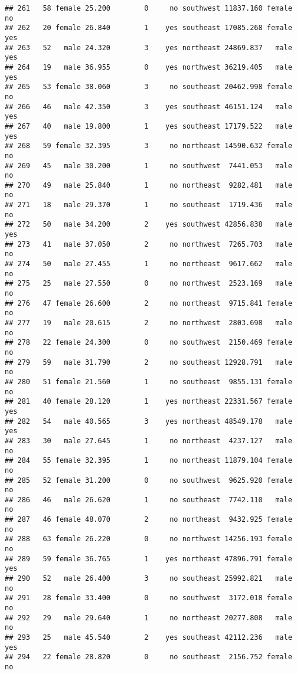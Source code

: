 \documentclass[
]{article}
\begin{document}
\begin{verbatim}
## 261   58 female 25.200        0     no southwest 11837.160 female       no
## 262   20 female 26.840        1    yes southeast 17085.268 female      yes
## 263   52   male 24.320        3    yes northeast 24869.837   male      yes
## 264   19   male 36.955        0    yes northwest 36219.405   male      yes
## 265   53 female 38.060        3     no southeast 20462.998 female       no
## 266   46   male 42.350        3    yes southeast 46151.124   male      yes
## 267   40   male 19.800        1    yes southeast 17179.522   male      yes
## 268   59 female 32.395        3     no northeast 14590.632 female       no
## 269   45   male 30.200        1     no southwest  7441.053   male       no
## 270   49   male 25.840        1     no northeast  9282.481   male       no
## 271   18   male 29.370        1     no southeast  1719.436   male       no
## 272   50   male 34.200        2    yes southwest 42856.838   male      yes
## 273   41   male 37.050        2     no northwest  7265.703   male       no
## 274   50   male 27.455        1     no northeast  9617.662   male       no
## 275   25   male 27.550        0     no northwest  2523.169   male       no
## 276   47 female 26.600        2     no northeast  9715.841 female       no
## 277   19   male 20.615        2     no northwest  2803.698   male       no
## 278   22 female 24.300        0     no southwest  2150.469 female       no
## 279   59   male 31.790        2     no southeast 12928.791   male       no
## 280   51 female 21.560        1     no southeast  9855.131 female       no
## 281   40 female 28.120        1    yes northeast 22331.567 female      yes
## 282   54   male 40.565        3    yes northeast 48549.178   male      yes
## 283   30   male 27.645        1     no northeast  4237.127   male       no
## 284   55 female 32.395        1     no northeast 11879.104 female       no
## 285   52 female 31.200        0     no southwest  9625.920 female       no
## 286   46   male 26.620        1     no southeast  7742.110   male       no
## 287   46 female 48.070        2     no northeast  9432.925 female       no
## 288   63 female 26.220        0     no northwest 14256.193 female       no
## 289   59 female 36.765        1    yes northeast 47896.791 female      yes
## 290   52   male 26.400        3     no southeast 25992.821   male       no
## 291   28 female 33.400        0     no southwest  3172.018 female       no
## 292   29   male 29.640        1     no northeast 20277.808   male       no
## 293   25   male 45.540        2    yes southeast 42112.236   male      yes
## 294   22 female 28.820        0     no southeast  2156.752 female       no

\end{verbatim}
\end{document}
